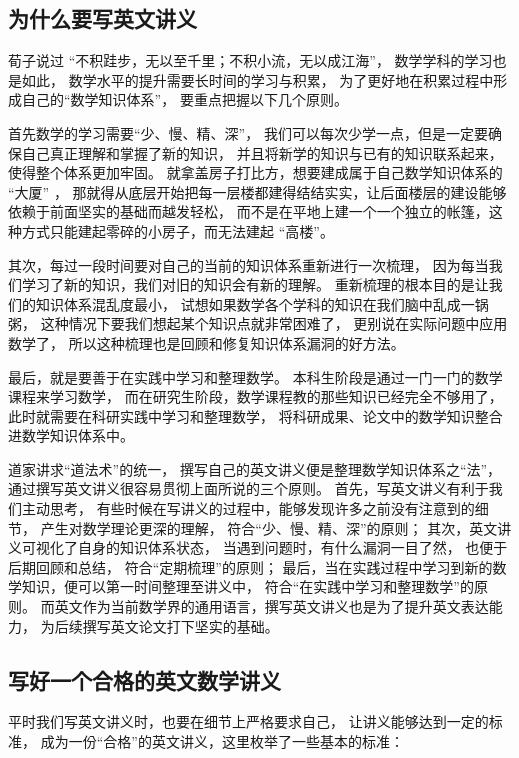 
\subsection{为什么要写英文讲义}

荀子说过 “不积跬步，无以至千里；不积小流，无以成江海”，
数学学科的学习也是如此，
数学水平的提升需要长时间的学习与积累，
为了更好地在积累过程中形成自己的“数学知识体系”，
要重点把握以下几个原则。

首先数学的学习需要“少、慢、精、深”，
我们可以每次少学一点，但是一定要确保自己真正理解和掌握了新的知识，
并且将新学的知识与已有的知识联系起来，使得整个体系更加牢固。
就拿盖房子打比方，想要建成属于自己数学知识体系的 “大厦” ，
那就得从底层开始把每一层楼都建得结结实实，让后面楼层的建设能够依赖于前面坚实的基础而越发轻松，
而不是在平地上建一个一个独立的帐篷，这种方式只能建起零碎的小房子，而无法建起 “高楼”。

其次，每过一段时间要对自己的当前的知识体系重新进行一次梳理，
因为每当我们学习了新的知识，我们对旧的知识会有新的理解。
重新梳理的根本目的是让我们的知识体系混乱度最小，
试想如果数学各个学科的知识在我们脑中乱成一锅粥，
这种情况下要我们想起某个知识点就非常困难了，
更别说在实际问题中应用数学了，
所以这种梳理也是回顾和修复知识体系漏洞的好方法。

最后，就是要善于在实践中学习和整理数学。
本科生阶段是通过一门一门的数学课程来学习数学，
而在研究生阶段，数学课程教的那些知识已经完全不够用了，
此时就需要在科研实践中学习和整理数学，
将科研成果、论文中的数学知识整合进数学知识体系中。

道家讲求“道法术”的统一，
撰写自己的英文讲义便是整理数学知识体系之“法”，
通过撰写英文讲义很容易贯彻上面所说的三个原则。
首先，写英文讲义有利于我们主动思考，
有些时候在写讲义的过程中，能够发现许多之前没有注意到的细节，
产生对数学理论更深的理解，
符合“少、慢、精、深”的原则；
其次，英文讲义可视化了自身的知识体系状态，
当遇到问题时，有什么漏洞一目了然，
也便于后期回顾和总结，
符合“定期梳理”的原则；
最后，当在实践过程中学习到新的数学知识，便可以第一时间整理至讲义中，
符合“在实践中学习和整理数学”的原则。
而英文作为当前数学界的通用语言，撰写英文讲义也是为了提升英文表达能力，
为后续撰写英文论文打下坚实的基础。

\subsection{写好一个合格的英文数学讲义}

平时我们写英文讲义时，也要在细节上严格要求自己，
让讲义能够达到一定的标准，
成为一份“合格”的英文讲义，这里枚举了一些基本的标准：

